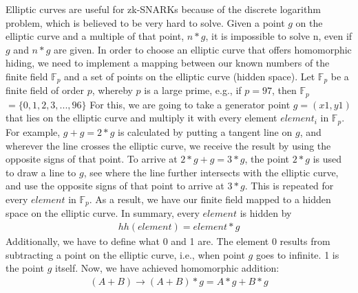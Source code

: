 Elliptic curves are useful for zk-SNARKs because of the discrete logarithm problem, which is believed to be very hard to solve. Given a point \(g\) on the elliptic curve and a multiple of that point, \(n*g\), it is impossible to solve n, even if \(g\) and \(n*g\) are given. In order to choose an elliptic curve that offers homomorphic hiding, we need to implement a mapping between our known numbers of the finite field \begin{math}\mathbb{F}_p\end{math} and a set of points on the elliptic curve (hidden space). Let \begin{math}\mathbb{F}_p\end{math} be a finite field of order \(p\), whereby \(p\) is a large prime, e.g., if \(p=97\), then \begin{math}\mathbb{F}_p\end{math} \(=\{0, 1, 2, 3, ..., 96\}\) For this, we are going to take a generator point \(g = (x1,y1)\) that lies on the elliptic curve and multiply it with every element \({element}_i\) in \begin{math}\mathbb{F}_p\end{math}. For example, \(g + g = 2*g\) is calculated by putting a tangent line on \(g\), and wherever the line crosses the elliptic curve, we receive the result by using the opposite signs of that point. To arrive at \(2*g + g = 3*g\), the point \(2*g\) is used to draw a line to \(g\), see where the line further intersects with the elliptic curve, and use the opposite signs of that point to arrive at \(3*g\). This is repeated for every \(element\) in \begin{math}\mathbb{F}_p\end{math}. As a result, we have our finite field mapped to a hidden space on the elliptic curve. In summary, every 
\(element\) is hidden by
\begin{align}
    hh(element) = element * g
\end{align}
Additionally, we have to define what 0 and 1 are. The element 0 results from subtracting a point on the elliptic curve, i.e., when point \(g\) goes to infinite. 1 is the point \(g\) itself.
Now, we have achieved homomorphic addition:
\begin{align}
    (A + B) \longrightarrow (A + B) * g = A*g + B*g
\end{align}

